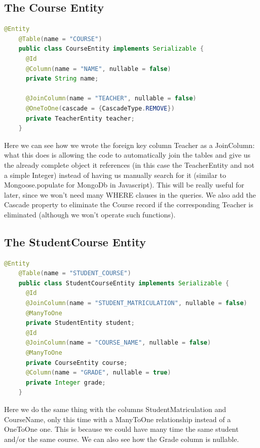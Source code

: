 \documentclass[12pt, a4paper]{article}
\begin{document}
  \subsection{The Course Entity}
  \begin{lstlisting}[language=java, caption={The Course Entity}]
    @Entity
    @Table(name = "COURSE")
    public class CourseEntity implements Serializable {
      @Id
      @Column(name = "NAME", nullable = false)
      private String name;

      @JoinColumn(name = "TEACHER", nullable = false)
      @OneToOne(cascade = {CascadeType.REMOVE})
      private TeacherEntity teacher;
    }
  \end{lstlisting}

  Here we can see how we wrote the foreign key column Teacher as a JoinColumn: what this does is allowing the code to automatically join the tables and give us the already complete object it references (in this case the TeacherEntity and not a simple Integer) instead of having us manually search for it (similar to Mongoose.populate for MongoDb in Javascript). This will be really useful for later, since we won't need many WHERE clauses in the queries. We also add the Cascade property to eliminate the Course record if the corresponding Teacher is eliminated (although we won't operate such functions).

  \subsection{The StudentCourse Entity}
  \begin{lstlisting}[language=java, caption={The StudentCourse Entity}]
    @Entity
    @Table(name = "STUDENT_COURSE")
    public class StudentCourseEntity implements Serializable {
      @Id
      @JoinColumn(name = "STUDENT_MATRICULATION", nullable = false)
      @ManyToOne
      private StudentEntity student;
      @Id
      @JoinColumn(name = "COURSE_NAME", nullable = false)
      @ManyToOne
      private CourseEntity course;
      @Column(name = "GRADE", nullable = true)
      private Integer grade;
    }
  \end{lstlisting}

  Here we do the same thing with the columns StudentMatriculation and CourseName, only this time with a ManyToOne relationship instead of a OneToOne one. This is because we could have many time the same student and/or the same course. We can also see how the Grade column is nullable.

  \pagebreak
\end{document}
